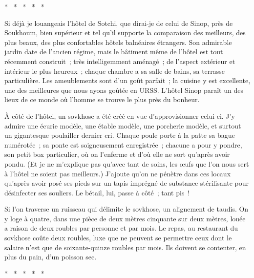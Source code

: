 \documentclass[french,twoside]{book} %
\begin{document}
\begin{center}
\noindent \centerline{*  *  *  *  *}\par
\end{center}

\noindent Si déjà je louangeais l’hôtel de Sotchi, que dirai-je de celui de Sinop, près de Soukhoum, bien supérieur et tel qu’il supporte la comparaison des meilleurs, des plus beaux, des plus confortables hôtels balnéaires étrangers. Son admirable jardin date de l’ancien régime, mais le bâtiment même de l’hôtel est tout récemment construit ; très intelligemment aménagé ; de l’aspect extérieur et intérieur le plus heureux ; chaque chambre a sa salle de bains, sa terrasse particulière. Les ameublements sont d’un goût parfait ; la cuisine y est excellente, une des meilleures que nous ayons goûtée en URSS. L’hôtel Sinop paraît un des lieux de ce monde où l’homme se trouve le plus près du bonheur.\par
À côté de l’hôtel, un sovkhose a été créé en vue d’approvisionner celui-ci. J’y admire une écurie modèle, une étable modèle, une porcherie modèle, et surtout un gigantesque poulailler dernier cri. Chaque poule porte à la patte sa bague numérotée ; sa ponte est soigneusement enregistrée ; chacune a pour y pondre, son petit box particulier, où on l’enferme et d’où elle ne sort qu’après avoir pondu. (Et je ne m’explique pas qu’avec tant de soins, les œufs que l’on nous sert à l’hôtel ne soient pas meilleurs.) J’ajoute qu’on ne pénètre dans ces locaux qu’après avoir posé ses pieds sur un tapis imprégné de substance stérilisante pour désinfecter ses souliers. Le bétail, lui, passe à côté ; tant pis !\par
Si l’on traverse un ruisseau qui délimite le sovkhose, un alignement de taudis. On y loge à quatre, dans une pièce de deux mètres cinquante sur deux mètres, louée a raison de deux roubles par personne et par mois. Le repas, au restaurant du sovkhose coûte deux roubles, luxe que ne peuvent se permettre ceux dont le salaire n’est que de soixante-quinze roubles par mois. Ils doivent se contenter, en plus du pain, d’un poisson sec.\par

\begin{center}
\noindent \centerline{*  *  *  *  *}\par
\end{center}
\end{document}
